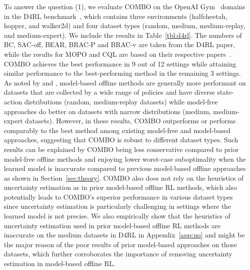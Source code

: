 To answer the question (1), we evaluate COMBO on the OpenAI Gym~\citep{brockman2016openai} domains in the D4RL benchmark~\citep{fu2020d4rl}, which contains three environments (halfcheetah, hopper, and walker2d) and four dataset types (random, medium, medium-replay, and medium-expert). We include the results in Table~\ref{tbl:d4rl}. The numbers of BC, SAC-off, BEAR, BRAC-P and BRAC-v are taken from the D4RL paper, while the results for MOPO and CQL are based on their respective papers~\citep{yu2020mopo,kumar2020conservative}. COMBO achieves the best performance in 9 out of 12 settings while attaining similar performance to the best-performing method in the remaining 3 settings. As noted by \citet{yu2020mopo} and \citet{Rafailov2020LOMPO}, model-based offline methods are generally more performant on datasets that are collected by a wide range of policies and have diverse state-action distributions (random, medium-replay datasets)
while model-free approaches do better on datasets with narrow distributions (medium, medium-expert datasets). However, in these results, COMBO outperforms or performs comparably to the best method among existing model-free and model-based approaches, suggesting that COMBO is robust to different dataset types. Such results can be explained by COMBO being less conservative compared to prior model-free offline methods and enjoying lower worst-case suboptimality when the learned model is inaccurate compared to previous model-based offline approaches as shown in Section~\ref{sec:theory}. COMBO also does not rely on the heuristics of uncertainty estimation as in prior model-based offline RL methods, which also potentially leads to COMBO's superior performance in various dataset types since uncertainty estimation is particularly challenging in settings where the learned model is not precise. We also empirically show that the heuristics of uncertainty estimation used in prior model-based offline RL methods are inaccurate on the medium datasets in D4RL in Appendix~\ref{app:uq} and might be the major reason of the poor results of prior model-based approaches on those datasets, which further corroborates the importance of removing uncertainty estimation in model-based offline RL.

